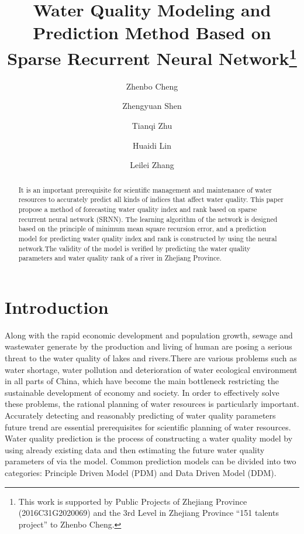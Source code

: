 \documentclass[runningheads]{llncs}
\begin{document}
%
\title{Water Quality Modeling and Prediction Method Based on Sparse Recurrent Neural Network\thanks{This work is supported by Public Projects of Zhejiang Province (2016C31G2020069) and the 3rd Level in Zhejiang Province “151 talents project” to Zhenbo Cheng.}}
%
%
\author{Zhenbo Cheng\inst{} \and
Zhengyuan Shen\inst{} \and
Tianqi Zhu\inst{}\and
Huaidi Lin\inst{}\and
Leilei Zhang\inst{}}
%
%
%
\maketitle              %
%
\begin{abstract}
It is an important prerequisite for scientific management and maintenance of water 
resources to accurately predict all kinds of indices that affect water quality. 
This paper propose a method of forecasting water quality index and rank based on sparse 
recurrent neural network (SRNN). The learning algorithm of the network is designed 
based on the principle of minimum mean square recursion error, and a 
prediction model for predicting water quality index and rank is 
constructed by using the neural network.The validity of the model is verified 
by predicting the water quality parameters and water quality rank
of a river in Zhejiang Province.


\end{abstract}
%
%
%

\section{Introduction}
Along with the rapid economic development and population growth, 
sewage and wastewater generate by the production and living of 
human are posing a serious threat to the water quality of lakes and 
rivers\cite{RN1}.There are various problems such as water shortage, water 
pollution and deterioration of water ecological environment in all 
parts of China\cite{RN1}, which have become the main bottleneck restricting the 
sustainable development of economy and society. In order to effectively 
solve these problems, the rational planning 
of water resources is particularly important\cite{RN2,RN3}. Accurately 
detecting and reasonably predicting of water quality parameters future trend
are essential prerequisites for scientific planning of water resources\cite{RN4}. 
Water quality prediction is the process of constructing a water quality model by using 
already existing data and then estimating the future water quality parameters of 
via the model. Common prediction models can be divided 
into two categories: Principle Driven Model (PDM) and Data Driven Model (DDM).
\end{document}
